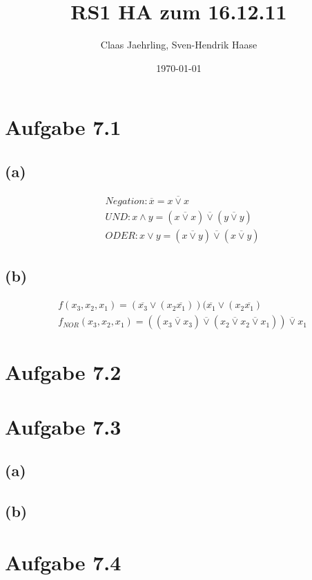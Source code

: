 \documentclass[12pt]{article}
\author{Claas Jaehrling, Sven-Hendrik Haase}
\title{RS1 HA zum 16.12.11}
\date{\today}
\begin{document}
\setcounter{secnumdepth}{0}
\maketitle

\section{Aufgabe 7.1}
\subsection{(a)}
\begin{align}
&Negation: \overline x = x \overline \lor x\\
&UND: x \land y = (x \overline \lor x) \overline \lor (y \overline \lor y)\\
&ODER: x \lor y = (x \overline \lor y) \overline \lor (x \overline \lor y)
\end{align}
\subsection{(b)}
\begin{align}
&f(x_3,x_2,x_1) = (\overline {x_3} \lor (x_2 \overline {x_1})) (\overline {x_1} \lor (x_2 \overline {x_1})\\
&f_{NOR}(x_3,x_2,x_1) = ((x_3 \overline \lor x_3) \overline \lor (x_2 \overline \lor x_2 \overline \lor x_1)) \overline \lor x_1
\end{align}

\section{Aufgabe 7.2}


\section{Aufgabe 7.3}
\subsection{(a)}

\subsection{(b)}

\section{Aufgabe 7.4}
\end{document}
